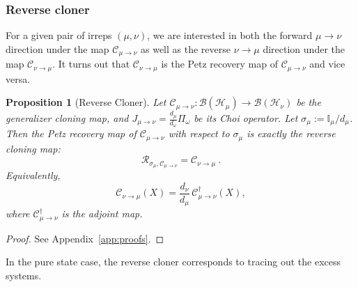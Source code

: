 \documentclass[a4paper,onecolumn,11pt]{quantumarticle}
\newtheorem{prop}{Proposition}
\def\id{\mathbb{I}}
\def\C{\mathcal{C}}
\begin{document}
\subsubsection{Reverse cloner}
For a given pair of irreps $(\mu,\nu)$, we are interested in both the forward $\mu\to\nu$ direction under the map $\C_{\mu\to\nu}$ as well as the reverse $\nu\to\mu$ direction under the map $\C_{\nu\to\mu}$.  It turns out that $\C_{\nu\to\mu}$ is the Petz recovery map of $\C_{\mu\to\nu}$ and vice versa. 
\begin{prop}[Reverse Cloner]\label{prop:reverse}
Let $\C_{\mu\to\nu}:\mathcal B(\mathcal H_\mu)\to \mathcal B(\mathcal H_\nu)$
be the generalizer cloning map, and $J_{\mu\to\nu}=\frac{d_\mu}{d_\omega}\Pi_\omega$ be its Choi operator. Let $\sigma_\mu :=  \id_\mu/d_\mu$.
Then the Petz recovery map of \(\C_{\mu\to\nu}\) with respect to \(\sigma_\mu\) is exactly the reverse  cloning map:
\[
\mathcal R_{\sigma_\mu,\C_{\mu\to\nu}}=\C_{\nu\to\mu}\ .
\]
Equivalently,
\[
\C_{\nu\to\mu}(X)=\frac{d_\nu}{d_\mu}\,\C_{\mu\to\nu}^{\dagger}(X),
\]
where \(\C_{\mu\to\nu}^{\dagger}\) is the adjoint map.
\end{prop}
\begin{proof}
See Appendix~\ref{app:proofs}.
\end{proof}
In the pure state case, the reverse cloner corresponds to tracing out the excess systems.
\end{document}
